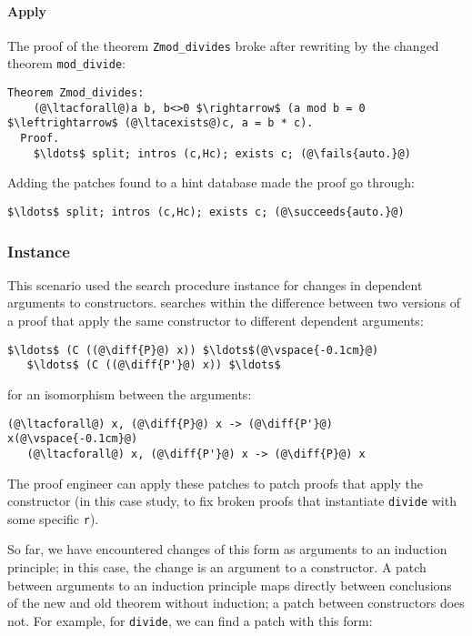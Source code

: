 \paragraph{Apply} The proof of the theorem \lstinline{Zmod_divides} broke after rewriting by the changed theorem \lstinline{mod_divide}:

\begin{lstlisting}[language=coq]
  Theorem Zmod_divides:
    (@\ltacforall@)a b, b<>0 $\rightarrow$ (a mod b = 0 $\leftrightarrow$ (@\ltacexists@)c, a = b * c).
  Proof.
    $\ldots$ split; intros (c,Hc); exists c; (@\fails{auto.}@)
\end{lstlisting}
Adding the patches \sysname found to a hint database made the proof go through:

\begin{lstlisting}[language=coq]
    $\ldots$ split; intros (c,Hc); exists c; (@\succeeds{auto.}@)
\end{lstlisting}

\subsubsection{Instance}

This scenario used the search procedure instance for changes in dependent arguments to constructors.
\sysname searches within the difference between two versions of a proof that apply the same constructor
to different dependent arguments:

\begin{lstlisting}[language=coq]
   $\ldots$ (C ((@\diff{P}@) x)) $\ldots$(@\vspace{-0.1cm}@)
   $\ldots$ (C ((@\diff{P'}@) x)) $\ldots$
\end{lstlisting}
for an isomorphism between the arguments:

\begin{lstlisting}[language=coq]
   (@\ltacforall@) x, (@\diff{P}@) x -> (@\diff{P'}@) x(@\vspace{-0.1cm}@)
   (@\ltacforall@) x, (@\diff{P'}@) x -> (@\diff{P}@) x
\end{lstlisting}
The proof engineer can apply these patches to patch proofs that apply the constructor (in this case study,
to fix broken proofs that instantiate \lstinline{divide} with some specific \lstinline{r}).

So far, we have encountered changes of this form as arguments to an 
induction principle; in this case, the change is an argument to a constructor.
A patch between arguments to an induction principle maps
directly between conclusions of the new and old theorem without
induction; a patch between constructors does not.
For example, for \lstinline{divide}, we can find a patch with this form:

